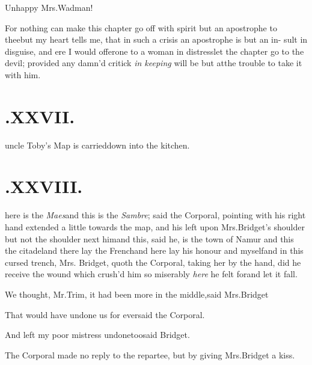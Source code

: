 \documentclass[twoside]{article}
\begin{document}
Unhappy Mrs.\@ Wadman!\tsh

\tsh For nothing can make this chapter go off with
spirit but an apostrophe to thee\tsh but my heart tells
me, that in such a crisis an apostrophe is but an in- sult in
disguise, and ere I would offer\break one to a woman in
distress\tsk let the chapter go to the devil; provided any
damn’d critick \textit{in keeping} will be but at\break the trouble to
take it with him.


\vfill{}\eject
\null\vfill
\section{.\enspace XXVII.}

 uncle Toby’s Map is
carried\break down into the kitchen.

\vfill
{}\eject

\section{\chapstrut{}.\enspace XXVIII.}

 here is the
\textit{Maes}\tsk and this is the \textit{Sambre}; said the Corporal,
pointing with his right hand extended a little towards the map, and
his left upon Mrs.\@ Bridget’s shoulder\tsk\break
\tsk but not the shoulder next him\tsk and 
this, said he, is the town of Namur\tsk\break 
and this the citadel\tsk and there lay the
French\tsk and here lay his honour and
myself\tsh and in this cursed trench, Mrs.\break 
Bridget, quoth the Corporal, taking her
by the hand, did he receive the wound 
which crush’d him so miserably \textit{here}\tsk\break 
{}
he felt for\tsh and let it fall.

We thought, Mr.\@ Trim, it had been more in the
middle,\tsh said Mrs.\break Bridget\tsh

\vskip -2pt

That would have undone us for ever\tsk\break said the Corporal.

\vskip -2pt

\tsh And left my poor mistress undone\break too\tsk said Bridget.

\vskip -2pt

The Corporal made no reply to the repartee, but by giving Mrs.\@ Bridget a kiss.
\end{document}

